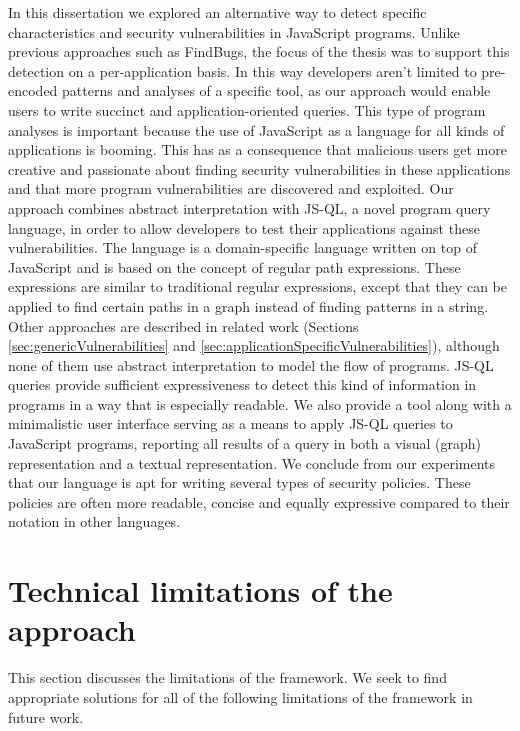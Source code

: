 In this dissertation we explored an alternative way to detect specific characteristics and security vulnerabilities in JavaScript programs. Unlike previous approaches such as FindBugs\cite{Findbugs}, the focus of the thesis was to support this detection on a per-application basis. In this way developers aren't limited to pre-encoded patterns and analyses of a specific tool, as our approach would enable users to write succinct and application-oriented queries. This type of program analyses is important because the use of JavaScript as a language for all kinds of applications is booming. This has as a consequence that malicious users get more creative and passionate about finding security vulnerabilities in these applications and that more program vulnerabilities are discovered and exploited. Our approach combines abstract interpretation with JS-QL, a novel program query language, in order to allow developers to test their applications against these vulnerabilities. The language is a domain-specific language written on top of JavaScript and is based on the concept of regular path expressions. These expressions are similar to traditional regular expressions, except that they can be applied to find certain paths in a graph instead of finding patterns in a string. Other approaches are described in related work (Sections \ref{sec:genericVulnerabilities} and \ref{sec:applicationSpecificVulnerabilities}), although none of them use abstract interpretation to model the flow of programs. JS-QL queries provide sufficient expressiveness to detect this kind of information in programs in a way that is especially readable. We also provide a tool along with a minimalistic user interface serving as a means to apply JS-QL queries to JavaScript programs, reporting all results of a query in both a visual (graph) representation and a textual representation. We conclude from our experiments that our language is apt for writing several types of security policies. These policies are often more readable, concise and equally expressive compared to their notation in other languages. 

\section{Technical limitations of the approach}

This section discusses the limitations of the framework. We seek to find appropriate solutions for all of the following limitations of the framework in future work.

